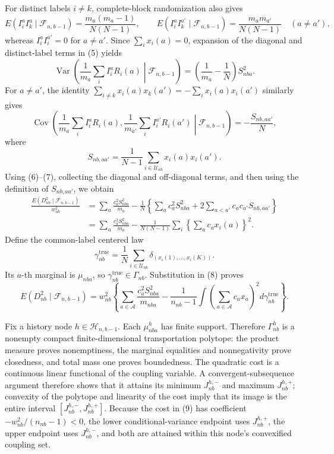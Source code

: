 For distinct labels \(i\ne k\), complete-block randomization also gives
\[
E(I_i^aI_k^a\mid\mathcal F_{n,b-1})
=\frac{m_a(m_a-1)}{N(N-1)},
\qquad
E(I_i^aI_k^{a'}\mid\mathcal F_{n,b-1})
=\frac{m_am_{a'}}{N(N-1)}\quad(a\ne a'),
\tag{5}
\]
whereas \(I_i^aI_i^{a'}=0\) for \(a\ne a'\). Since \(\sum_i x_i(a)=0\), expansion of the diagonal and distinct-label terms in (5) yields
\[
\operatorname{Var}\!\left(\frac1{m_a}\sum_iI_i^aR_i(a)\middle|\mathcal F_{n,b-1}\right)
=\left(\frac1{m_a}-\frac1N\right)S_{nba}^2.
\tag{6}
\]
For \(a\ne a'\), the identity \(\sum_{i\ne k}x_i(a)x_k(a')=-\sum_i x_i(a)x_i(a')\) similarly gives
\[
\operatorname{Cov}\!\left(\frac1{m_a}\sum_iI_i^aR_i(a),
\frac1{m_{a'}}\sum_iI_i^{a'}R_i(a')\middle|\mathcal F_{n,b-1}\right)
=-\frac{S_{nb,aa'}}N,
\tag{7}
\]
where
\[
S_{nb,aa'}=\frac1{N-1}\sum_{i\in\mathcal U_{nb}}x_i(a)x_i(a').
\]
Using (6)--(7), collecting the diagonal and off-diagonal terms, and then using the definition of \(S_{nb,aa'}\), we obtain
\[
\begin{aligned}
\frac{E(D_{nb}^2\mid\mathcal F_{n,b-1})}{w_{nb}^2}
&=\sum_a\frac{c_a^2S_{nba}^2}{m_a}
-\frac1N\left\{\sum_a c_a^2S_{nba}^2+2\sum_{a<a'}c_ac_{a'}S_{nb,aa'}\right\}\\
&=\sum_a\frac{c_a^2S_{nba}^2}{m_a}
-\frac1{N(N-1)}\sum_i\left\{\sum_a c_ax_i(a)\right\}^2.
\end{aligned}
\tag{8}
\]
Define the common-label centered law
\[
\gamma_{nb}^{\mathrm{true}}
=\frac1N\sum_{i\in\mathcal U_{nb}}\delta_{(x_i(1),\ldots,x_i(K))}.
\]
Its \(a\)-th marginal is \(\mu_{nba}\), so \(\gamma_{nb}^{\mathrm{true}}\in\Gamma_{nb}\). Substitution in (8) proves
\[
E(D_{nb}^2\mid\mathcal F_{n,b-1})
=w_{nb}^2\left\{\sum_{a\in\mathcal A}\frac{c_a^2S_{nba}^2}{m_{nba}}
-\frac1{n_{nb}-1}\int\left(\sum_{a\in\mathcal A}c_ax_a\right)^2d\gamma_{nb}^{\mathrm{true}}\right\}.
\tag{9}
\]

Fix a history node \(h\in\mathcal H_{n,b-1}\). Each \(\mu_{nba}^h\) has finite support. Therefore \(\Gamma_{nb}^h\) is a nonempty compact finite-dimensional transportation polytope: the product measure proves nonemptiness, the marginal equalities and nonnegativity prove closedness, and total mass one proves boundedness. The quadratic cost is a continuous linear functional of the coupling variable. A convergent-subsequence argument therefore shows that it attains its minimum \(J_{nb}^{h,-}\) and maximum \(J_{nb}^{h,+}\); convexity of the polytope and linearity of the cost imply that its image is the entire interval \([J_{nb}^{h,-},J_{nb}^{h,+}]\). Because the cost in (9) has coefficient \(-w_{nb}^2/(n_{nb}-1)<0\), the lower conditional-variance endpoint uses \(J_{nb}^{h,+}\), the upper endpoint uses \(J_{nb}^{h,-}\), and both are attained within this node's convexified coupling set.

